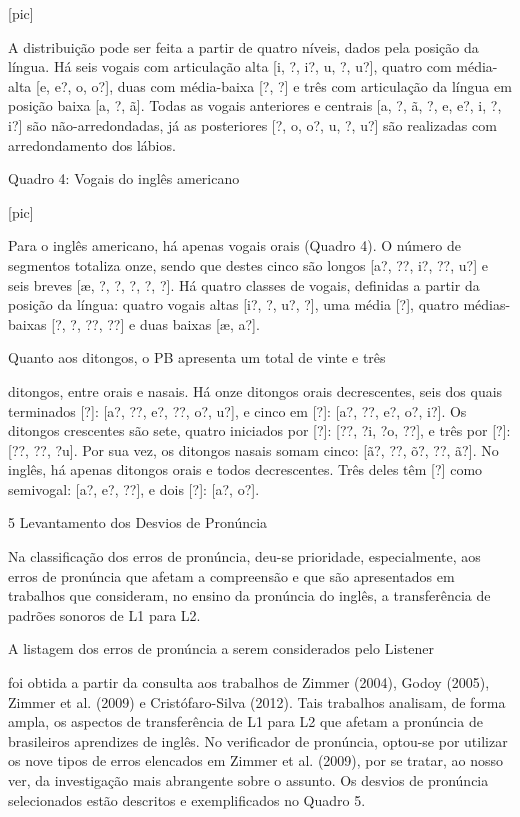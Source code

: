                                 [pic]

A distribui\c{c}\~ao pode ser feita a partir de quatro n\'iveis, dados pela
posi\c{c}\~ao da l\'ingua. H\'a seis vogais com articula\c{c}\~ao alta {[}i, ?, i?, u,
?, u?{]}, quatro com m\'edia-alta {[}e, e?, o, o?{]}, duas com m\'edia-baixa
{[}?, ?{]} e tr\^es com articula\c{c}\~ao da l\'ingua em posi\c{c}\~ao baixa {[}a, ?,
\~a{]}. Todas as vogais anteriores e centrais {[}a, ?, \~a, ?, e, e?, i, ?,
i?{]} s\~ao n\~ao-arredondadas, j\'a as posteriores {[}?, o, o?, u, ?, u?{]}
s\~ao realizadas com arredondamento dos l\'abios.

                Quadro 4: Vogais do ingl\^es americano

                                [pic]

Para o ingl\^es americano, h\'a apenas vogais orais (Quadro 4). O n\'umero de
segmentos totaliza onze, sendo que destes cinco s\~ao longos {[}a?, ??,
i?, ??, u?{]} e seis breves {[}æ, ?, ?, ?, ?, ?{]}. H\'a quatro classes de
vogais, definidas a partir da posi\c{c}\~ao da l\'ingua: quatro vogais altas
{[}i?, ?, u?, ?{]}, uma m\'edia {[}?{]}, quatro m\'edias-baixas {[}?, ?, ??,
??{]} e duas baixas {[}æ, a?{]}.

  Quanto aos  ditongos,  o  PB  apresenta  um  total  de  vinte  e  tr\^es

ditongos, entre orais e nasais. H\'a onze ditongos orais decrescentes,
seis dos quais terminados {[}?{]}: {[}a?, ??, e?, ??, o?, u?{]}, e cinco
em {[}?{]}: {[}a?, ??, e?, o?, i?{]}. Os ditongos crescentes s\~ao sete,
quatro iniciados por {[}?{]}: {[}??, ?i, ?o, ??{]}, e tr\^es por {[}?{]}:
{[}??, ??, ?u{]}. Por sua vez, os ditongos nasais somam cinco: {[}\~a?,
??, \~o?, ??, \~a?{]}. No ingl\^es, h\'a apenas ditongos orais e todos
decrescentes. Tr\^es deles t\^em {[}?{]} como semivogal: {[}a?, e?, ??{]}, e
dois {[}?{]}: {[}a?, o?{]}.

5 Levantamento dos Desvios de Pron\'uncia

Na classifica\c{c}\~ao dos erros de pron\'uncia, deu-se prioridade,
especialmente, aos erros de pron\'uncia que afetam a compreens\~ao e que s\~ao
apresentados em trabalhos que consideram, no ensino da pron\'uncia do
ingl\^es, a transfer\^encia de padr\~oes sonoros de L1 para L2.

  A listagem dos erros de pron\'uncia a serem considerados  pelo  Listener

foi obtida a partir da consulta aos trabalhos de Zimmer (2004), Godoy
(2005), Zimmer et al. (2009) e Crist\'ofaro-Silva (2012). Tais trabalhos
analisam, de forma ampla, os aspectos de transfer\^encia de L1 para L2 que
afetam a pron\'uncia de brasileiros aprendizes de ingl\^es. No verificador
de pron\'uncia, optou-se por utilizar os nove tipos de erros elencados em
Zimmer et al. (2009), por se tratar, ao nosso ver, da investiga\c{c}\~ao mais
abrangente sobre o assunto. Os desvios de pron\'uncia selecionados est\~ao
descritos e exemplificados no Quadro 5.

